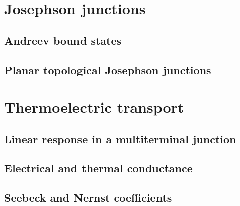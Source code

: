 \section{Josephson junctions}
\label{sec:jj}

\subsection{Andreev bound states}
\label{sec:abs}

\subsection{Planar topological Josephson junctions}
\label{sec:planar_jj}

\section{Thermoelectric transport}
\label{sec:thermo}

\subsection{Linear response in a multiterminal junction}
\label{sec:onsager}

\subsection{Electrical and thermal conductance}
\label{sec:G_kappa}

\subsection{Seebeck and Nernst coefficients}
\label{sec:seebeck}

